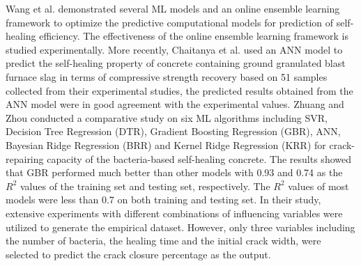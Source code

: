 \documentclass[11pt]{article}
\begin{document}
	Wang et al. \cite{wang2019towards} demonstrated several ML models and an online ensemble learning framework to optimize the predictive computational models for prediction of self-healing efficiency. The effectiveness of the online ensemble learning framework is studied experimentally. More recently, Chaitanya et al. \cite{chaitanya2020prediction} used an ANN model to predict the self-healing property of concrete containing ground granulated blast furnace slag in terms of compressive strength recovery based on 51 samples collected from their experimental studies, the  predicted  results  obtained  from  the  ANN  model  were  in good agreement with the experimental values. Zhuang and Zhou \cite{zhuang2019prediction} conducted a comparative study on six ML algorithms including SVR, Decision Tree Regression (DTR), Gradient Boosting Regression (GBR), ANN, Bayesian Ridge Regression (BRR) and Kernel Ridge Regression (KRR) for crack-repairing capacity of the bacteria-based self-healing concrete. The results showed that GBR performed much better than other models with 0.93 and 0.74 as the $R^2$ values of the training set and testing set, respectively. The $R^2$ values of most models were less than 0.7 on both training and testing set. In their study, extensive experiments with different combinations of influencing variables were utilized to generate the empirical dataset. However, only three variables including the number of bacteria, the healing time and the initial crack width, were selected to predict the crack closure percentage as the output.
	
		 
	
\end{document}
